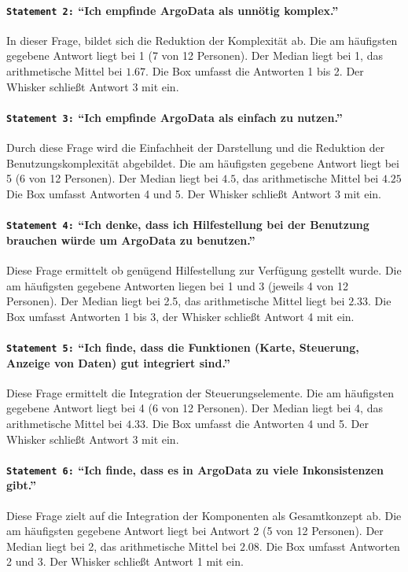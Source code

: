  \paragraph{\texttt{Statement 2:} "`Ich empfinde ArgoData als unnötig komplex."'}
    In dieser Frage, bildet sich die Reduktion der Komplexität ab.
    Die am häufigsten gegebene Antwort liegt bei 1 (7 von 12 Personen).  Der Median liegt bei 1, das arithmetische Mittel bei $1.67$. Die Box umfasst die Antworten 1 bis 2. Der Whisker schließt Antwort 3 mit ein.

  \paragraph{\texttt{Statement 3:} "`Ich empfinde ArgoData als einfach zu nutzen."'}
    Durch diese Frage wird die Einfachheit der Darstellung und die Reduktion der Benutzungskomplexität abgebildet. Die am häufigsten gegebene Antwort liegt bei 5 (6 von 12 Personen). Der Median liegt bei $4.5$, das arithmetische Mittel bei $4.25$   Die Box umfasst Antworten 4 und 5. Der Whisker schließt Antwort 3 mit ein.

\paragraph{\texttt{Statement 4:} "`Ich denke, dass ich Hilfestellung bei der Benutzung brauchen würde um ArgoData zu benutzen."'}
    Diese Frage ermittelt ob genügend Hilfestellung zur Verfügung gestellt wurde.  Die am häufigsten gegebene Antworten liegen bei 1 und 3 (jeweils 4 von 12 Personen).  Der Median liegt bei 2.5, das arithmetische Mittel liegt bei $2.33$. Die Box umfasst Antworten 1 bis 3, der Whisker schließt Antwort 4 mit ein.

\paragraph{\texttt{Statement 5:} "`Ich finde, dass die Funktionen (Karte, Steuerung, Anzeige von Daten) gut integriert sind."'}
    Diese Frage ermittelt die Integration der Steuerungselemente.
    Die am häufigsten gegebene Antwort liegt bei 4 (6 von 12 Personen). Der Median liegt bei 4, das arithmetische Mittel bei $4.33$. Die Box umfasst  die Antworten 4 und 5. Der Whisker schließt Antwort 3 mit ein.

\paragraph{\texttt{Statement 6:} "`Ich finde, dass es in ArgoData zu viele Inkonsistenzen gibt."'}
    Diese Frage zielt auf die Integration der Komponenten als Gesamtkonzept ab. Die am häufigsten gegebene Antwort liegt bei Antwort 2 (5 von 12 Personen). Der Median liegt bei 2, das arithmetische Mittel bei $2.08$. Die Box umfasst Antworten 2 und 3. Der Whisker schließt Antwort 1 mit ein.

